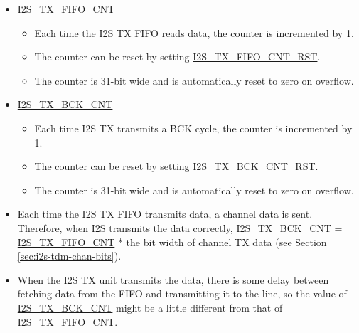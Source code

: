 \documentclass[main\_\_EN.tex]{subfiles}
\begin{document}
\begin{itemize}
    \item \hyperref[fielddesc:I2STXFIFOCNT]{I2S\_TX\_FIFO\_CNT}
    \begin{itemize}
        \item Each time the I2S TX FIFO reads data, the counter is incremented by 1.
        \item The counter can be reset by setting \hyperref[fielddesc:I2STXFIFOCNTRST]{I2S\_TX\_FIFO\_CNT\_RST}.
        \item The counter is 31-bit wide and is automatically reset to zero on overflow.
    \end{itemize}
    \item \hyperref[fielddesc:I2STXBCKCNT]{I2S\_TX\_BCK\_CNT}
    \begin{itemize}
        \item Each time I2S TX transmits a BCK cycle, the counter is incremented by 1.
        \item The counter can be reset by setting \hyperref[fielddesc:I2STXBCKCNTRST]{I2S\_TX\_BCK\_CNT\_RST}.
        \item The counter is 31-bit wide and is automatically reset to zero on overflow.
    \end{itemize}
\end{itemize}

\vspace{-0.5em}
\begin{tiplisting}
\vspace{-2em}
\begin{itemize}
    \item Each time the I2S TX FIFO transmits data, a channel data is sent. Therefore, when I2S transmits the data correctly, \hyperref[fielddesc:I2STXBCKCNT]{I2S\_TX\_BCK\_CNT} = \hyperref[fielddesc:I2STXFIFOCNT]{I2S\_TX\_FIFO\_CNT} * the bit width of channel TX data (see Section \ref{sec:i2s-tdm-chan-bits}).
    \item When the I2S TX unit transmits the data, there is some delay between fetching data from the FIFO and transmitting it to the line, so the value of \hyperref[fielddesc:I2STXBCKCNT]{I2S\_TX\_BCK\_CNT} might be a little different from that of \hyperref[fielddesc:I2STXFIFOCNT]{I2S\_TX\_FIFO\_CNT}.
\end{itemize}
\end{tiplisting}
\vspace{-1em}
\end{document}
